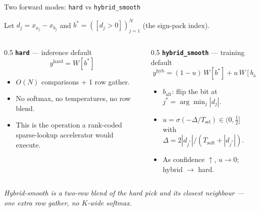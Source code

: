 \documentclass[aspectratio=169]{beamer}
\newcommand{\bstar}{b^{*}}
\newcommand{\jstar}{j^{*}}
\newcommand{\Tsoft}{T_{\mathrm{soft}}}
\newcommand{\Tsel}{T_{\mathrm{sel}}}
\begin{document}
\begin{frame}{Two forward modes: \texttt{hard} vs \texttt{hybrid\_smooth}}

Let \(d_j = x_{a_j} - x_{b_j}\) and \(\bstar = ([d_j > 0])_{j=1}^{N}\) (the sign-pack index).

\smallskip
\begin{columns}[T,onlytextwidth]
\begin{column}{0.5\textwidth}
\textbf{\texttt{hard}} --- inference default
\[ \boxed{\;y^{\mathrm{hard}} = W[\bstar]\;} \]
\begin{itemize}
\item \(O(N)\) comparisons + 1 row gather.
\item No softmax, no temperatures, no row blend.
\item This is the operation a rank-coded sparse-lookup accelerator would execute.
\end{itemize}
\end{column}
\begin{column}{0.5\textwidth}
\textbf{\texttt{hybrid\_smooth}} --- training default
\[ \boxed{\;y^{\mathrm{hyb}} = (1{-}u)\, W[\bstar] + u\, W[b_{\mathrm{alt}}]\;} \]
\begin{itemize}
\item \(b_{\mathrm{alt}}\): flip the bit at \(\jstar = \arg\min_j |d_j|\).
\item \(u = \sigma(-\Delta/\Tsel) \in (0, \tfrac{1}{2}]\) with \(\Delta = 2|d_{\jstar}|/(\Tsoft + |d_{\jstar}|).\)
\item As confidence \(\uparrow\), \(u \to 0\); hybrid \(\to\) hard.
\end{itemize}
\end{column}
\end{columns}

\vspace{0.5em}
\small\emph{Hybrid-smooth is a two-row blend of the hard pick and its closest neighbour --- one extra row gather, no \(K\)-wide softmax.}
\end{frame}
\end{document}
